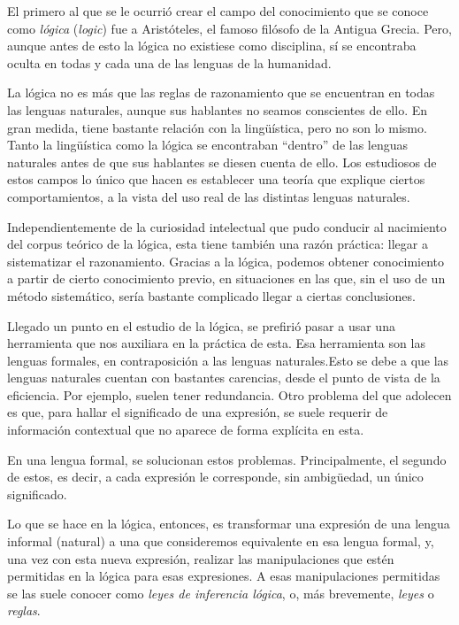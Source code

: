 


El primero al que se le ocurrió crear el campo del conocimiento que se
conoce como \emph{lógica} (\emph{logic}) fue a Aristóteles, el famoso
filósofo de la Antigua Grecia. Pero, aunque antes de esto la lógica no
existiese como disciplina, sí se encontraba oculta en todas y cada una de
las lenguas de la humanidad.

La lógica no es más que las reglas de razonamiento que se encuentran en
todas las lenguas naturales, aunque sus hablantes no seamos conscientes de
ello. En gran medida, tiene bastante relación con la lingüística, pero no
son lo mismo. Tanto la lingüística como la lógica se encontraban ``dentro''
de las lenguas naturales antes de que sus hablantes se diesen cuenta de
ello. Los estudiosos de estos campos lo único que hacen es establecer una
teoría que explique ciertos comportamientos, a la vista del uso real de las
distintas lenguas naturales.

Independientemente de la curiosidad intelectual que pudo conducir al
nacimiento del corpus teórico de la lógica, esta tiene también una razón
práctica: llegar a sistematizar el razonamiento. Gracias a la lógica,
podemos obtener conocimiento a partir de cierto conocimiento previo, en
situaciones en las que, sin el uso de un método sistemático, sería bastante
complicado llegar a ciertas conclusiones.

Llegado un punto en el estudio de la lógica, se prefirió pasar a usar una
herramienta que nos auxiliara en la práctica de esta. Esa herramienta son
las lenguas formales, en contraposición a las lenguas
naturales.\footnotemark Esto se debe a que las lenguas naturales cuentan con
bastantes carencias, desde el punto de vista de la eficiencia. Por ejemplo,
suelen tener redundancia. Otro problema del que adolecen es que, para hallar
el significado de una expresión, se suele requerir de información contextual
que no aparece de forma explícita en esta.



En una lengua formal, se solucionan estos problemas. Principalmente, el
segundo de estos, es decir, a cada expresión le corresponde, sin ambigüedad,
un único significado.

Lo que se hace en la lógica, entonces, es transformar una expresión de una
lengua informal (natural) a una que consideremos equivalente en esa lengua
formal, y, una vez con esta nueva expresión, realizar las manipulaciones que
estén permitidas en la lógica para esas expresiones. A esas manipulaciones
permitidas se las suele conocer como \emph{leyes de inferencia lógica}, o,
más brevemente, \emph{leyes} o \emph{reglas}.

